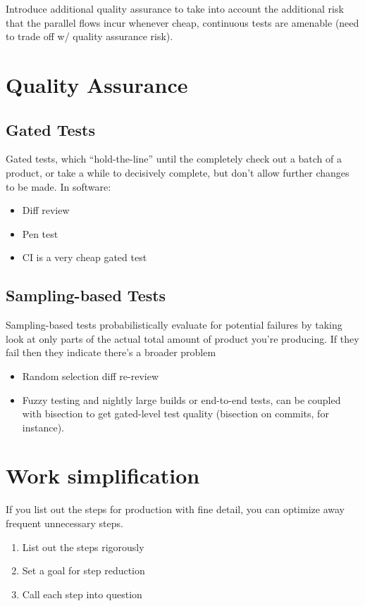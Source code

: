 \documentclass{article}
\begin{document}
Introduce additional quality assurance to take into account the additional risk that the parallel flows incur whenever cheap, continuous tests are amenable (need to trade off w/ quality assurance risk).

\section{Quality Assurance}

\subsection{Gated Tests}

Gated tests, which “hold-the-line” until the completely check out a batch of a product, or take a while to decisively complete, but don’t allow further changes to be made. In software:

\begin{itemize}
\item Diff review
\item Pen test
\item CI is a very cheap gated test
\end{itemize}

\subsection{Sampling-based Tests}

Sampling-based tests probabilistically evaluate for potential failures by taking look at only parts of the actual total amount of product you’re producing. If they fail then they indicate there’s a broader problem

\begin{itemize}
\item Random selection diff re-review
\item Fuzzy testing and nightly large builds or end-to-end tests, can be coupled with bisection to get gated-level test quality (bisection on commits, for instance).
\end{itemize}

\section{Work simplification}

If you list out the steps for production with fine detail, you can optimize away frequent unnecessary steps.

\begin{enumerate}
\item List out the steps rigorously
\item Set a goal for step reduction
\item Call each step into question
\end{enumerate}

{}

\end{document}
